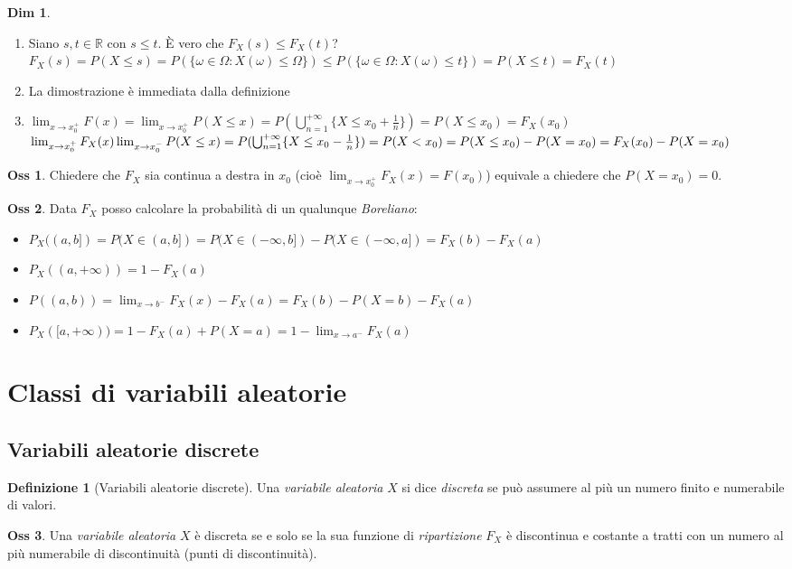 \documentclass[12pt, a4paper]{report}
\theoremstyle{definition}
\newtheorem{definition}{Definizione}[section]
\newtheorem*{demonstration}{Dim}
\newtheorem*{observation}{Oss}
\DeclareRobustCommand{\R}{\mathbb{R}}%
\begin{document}
\begin{demonstration}
	\mbox{}
	\begin{enumerate}[label=(\roman*)]
		\item Siano \(s,t\in\R\) con \(s\leq t\). È vero che \(F_X(s)\leq F_X(t)\)?\\
		\(F_X(s)=P(X\leq s)=P(\{\omega\in\Omega:X(\omega)\leq\Omega\})\leq P(\{
		\omega\in\Omega:X(\omega)\leq t\}) = P(X\leq t)=F_X(t)\)
		\item La dimostrazione è immediata dalla definizione
		\item \(\lim_{x\rightarrow x_0^+}F(x)=\lim_{x\rightarrow x_0^+}P(X\leq x)
		=P(\bigcup_{n=1}^{+\infty}\{X\leq x_0+\frac{1}{n}\})=P(X\leq x_0) = F_X(x_0)\)\\
		\(\lim_{x\rightarrow x_0^+}F_X(x)\lim_{x\rightarrow x_0^-}P(X\leq x)
		=P(\bigcup_{n=1}^{+\infty}\{X\leq x_0-\frac{1}{n}\})=P(X < x_0)=\\P(X\leq
		x_0) - P(X=x_0)=F_X(x_0)-P(X=x_0)\)
	\end{enumerate}
\end{demonstration}

\begin{observation}
	Chiedere che $F_X$ sia continua a destra in $x_0$ (cioè \(\lim_{x\rightarrow
	x_0^+}F_X(x)=F(x_0)\)) equivale a chiedere che \(P(X=x_0)=0\).
\end{observation}
\begin{observation}
	Data $F_X$ posso calcolare la probabilità di un qualunque \emph{Boreliano}:
	\begin{itemize}
		\item \(P_X((a, b])=P(X\in (a,b])=P(X\in (-\infty, b])-P(X\in(-\infty,a])
		=F_X(b)-F_X(a)\)
		\item \(P_X((a, +\infty))=1-F_X(a)\)
		\item \(P((a,b))=\lim_{x\rightarrow b^-}F_X(x)-F_X(a)=F_X(b)-P(X=b)-F_X(a)\)
		\item \(P_X([a,+\infty))=1-F_X(a)+P(X=a)=1-\lim_{x\rightarrow a^-}F_X(a)\)
	\end{itemize}
\end{observation}

\section{Classi di variabili aleatorie}
\subsection{Variabili aleatorie discrete}
\begin{definition}[Variabili aleatorie discrete]
	Una \emph{variabile aleatoria} $X$ si dice \emph{discreta} se può assumere
	al più un numero finito e numerabile di valori.
\end{definition}
\begin{observation}
	Una \emph{variabile aleatoria} $X$ è discreta se e solo se la sua funzione di
	\emph{ripartizione} $F_X$ è discontinua e costante a tratti con un numero al
	più	numerabile di discontinuità (punti di discontinuità).
\end{observation}
\end{document}
